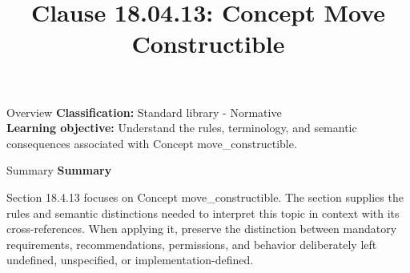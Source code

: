 \documentclass[10pt,letterpaper]{article}
\title{Clause 18.04.13: Concept Move Constructible}
\author{}
\date{}
\begin{document}
\maketitle
\begin{CornellOverviewBox}{Overview}
\textbf{Classification:} Standard library - Normative\\[2pt]
\textbf{Learning objective:} Understand the rules, terminology, and semantic consequences associated with Concept move\_constructible.
\end{CornellOverviewBox}\begin{CornellSummaryBox}{Summary}
{\sffamily\bfseries\color{Accent} Summary}\par\vspace{3pt}Section 18.4.13 focuses on Concept move\_constructible. The section supplies the rules and semantic distinctions needed to interpret this topic in context with its cross-references. When applying it, preserve the distinction between mandatory requirements, recommendations, permissions, and behavior deliberately left undefined, unspecified, or implementation-defined.
\end{CornellSummaryBox}
\end{document}
